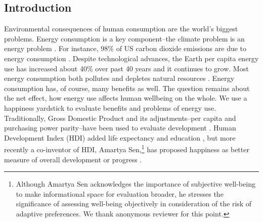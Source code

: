 \documentclass[10pt, letterpaper]{article}
\begin{document}
\vspace{.15in} 


\begin{spacing}{1.5}




\section*{\large \bf Introduction} %

Environmental consequences of human consumption are the world's biggest
problems.  Energy consumption is a key component--the climate problem is an
energy problem \citep{mackay08}. For instance, 98\% of US carbon dioxide emissions are due to
energy consumption \citep{eia08}. Despite
technological advances, the Earth per capita energy use has increased about 40\%
over past 40 years and it continues to grow. %
Most energy consumption both pollutes and  depletes natural resources
\citep{arrow04, soytas07}. %
 Energy consumption has, of course, many benefits as well.
 The question remains about the net effect, how energy use affects human
 wellbeing on the whole.
We use a happiness yardstick
to evaluate benefits and problems of energy use. Traditionally, Gross Domestic
Product and its adjustments--per capita and purchasing power parity--have been
used to evaluate development \citep{jorgenson14C}. Human Development Index (HDI)
added life expectancy and education \citep{steinberger10}, but more recently a
co-inventor of HDI, Amartya Sen,\footnote{Although
  Amartya Sen acknowledges the importance  of subjective well-being to make
  informational space for evaluation broader, he stresses the significance of
  assessing well-being objectively in consideration of the risk of adaptive
  preferences. We thank anonymous reviewer for this point.} has proposed happiness as better measure of
overall development or progress  \citep{stiglitz09al}. 


\end{spacing}
\end{document}
